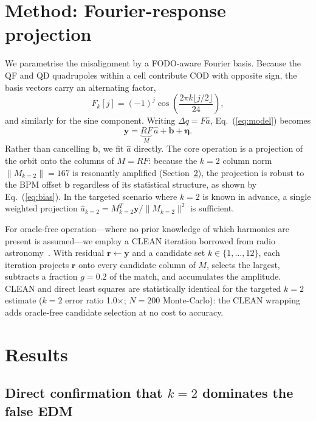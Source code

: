 \documentclass[preprint,12pt]{elsarticle}
\begin{document}
\section{Method: Fourier-response projection}
\label{sec:method}

We parametrise the misalignment by a FODO-aware Fourier basis. Because the
QF and QD quadrupoles within a cell contribute COD with opposite sign,
the basis vectors carry an alternating factor,
\begin{equation}
F_k[j] = (-1)^{j}\cos\!\left(\frac{2\pi k\lfloor j/2\rfloor}{24}\right),
\end{equation}
and similarly for the sine component. Writing $\Delta q = F\hat{a}$,
Eq.~(\ref{eq:model}) becomes
\begin{equation}
\mathbf{y} = \underbrace{R F}_{M}\,\hat{a} + \mathbf{b} + \boldsymbol{\eta}.
\end{equation}
Rather than cancelling $\mathbf{b}$, we fit $\hat{a}$ directly. The core
operation is a projection of the orbit onto the columns of $M=RF$: because
the $k=2$ column norm $\|M_{k=2}\|=167$ is resonantly amplified (Section~\ref{sec:results}),
the projection is robust to the BPM offset $\mathbf{b}$ regardless of its
statistical structure, as shown by Eq.~(\ref{eq:bias}). In the targeted
scenario where $k=2$ is known in advance, a single weighted projection
$\hat{a}_{k=2}=M_{k=2}^T\mathbf{y}/\|M_{k=2}\|^2$ is sufficient.

For oracle-free operation---where no prior knowledge of which harmonics are
present is assumed---we employ a CLEAN iteration borrowed from radio
astronomy~\cite{clean}. With residual $\mathbf{r}\leftarrow\mathbf{y}$ and
a candidate set $k\in\{1,\dots,12\}$, each iteration projects $\mathbf{r}$
onto every candidate column of $M$, selects the largest, subtracts a
fraction $g=0.2$ of the match, and accumulates the amplitude.
CLEAN and direct least squares are statistically identical for the targeted
$k=2$ estimate ($k=2$ error ratio 1.0$\times$; $N=200$ Monte-Carlo):
the CLEAN wrapping adds oracle-free candidate selection at no cost to accuracy.

\section{Results}
\label{sec:results}

\subsection{Direct confirmation that $k=2$ dominates the false EDM}
\label{sec:falseedm}
\end{document}
